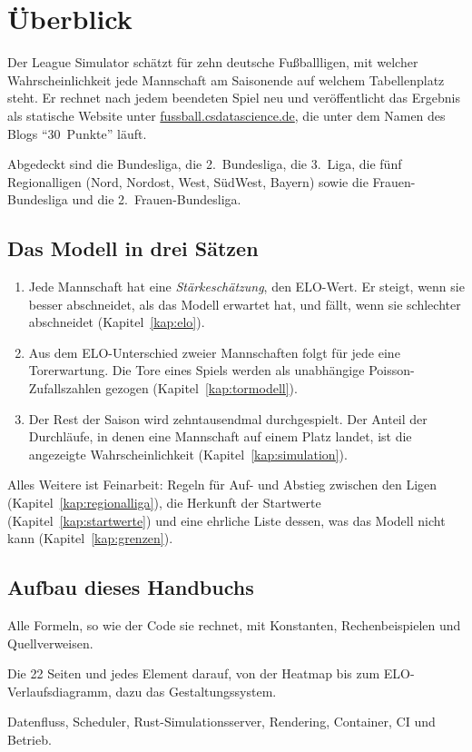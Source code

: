 \chapter{Überblick}

Der League Simulator schätzt für zehn deutsche Fußballligen, mit welcher
Wahrscheinlichkeit jede Mannschaft am Saisonende auf welchem Tabellenplatz
steht. Er rechnet nach jedem beendeten Spiel neu und veröffentlicht das
Ergebnis als statische Website unter
\href{https://fussball.csdatascience.de}{fussball.csdatascience.de}, die unter
dem Namen des Blogs \enquote{30~Punkte} läuft.

Abgedeckt sind die Bundesliga, die 2.~Bundesliga, die 3.~Liga, die fünf
Regionalligen (Nord, Nordost, West, SüdWest, Bayern) sowie die
Frauen-Bundesliga und die 2.~Frauen-Bundesliga.

\section*{Das Modell in drei Sätzen}

\begin{enumerate}
  \item Jede Mannschaft hat eine \emph{Stärkeschätzung}, den ELO-Wert. Er steigt,
        wenn sie besser abschneidet, als das Modell erwartet hat, und fällt,
        wenn sie schlechter abschneidet (Kapitel~\ref{kap:elo}).
  \item Aus dem ELO-Unterschied zweier Mannschaften folgt für jede eine
        Torerwartung. Die Tore eines Spiels werden als unabhängige
        Poisson-Zufallszahlen gezogen (Kapitel~\ref{kap:tormodell}).
  \item Der Rest der Saison wird zehntausendmal durchgespielt. Der Anteil der
        Durchläufe, in denen eine Mannschaft auf einem Platz landet, ist die
        angezeigte Wahrscheinlichkeit (Kapitel~\ref{kap:simulation}).
\end{enumerate}

Alles Weitere ist Feinarbeit: Regeln für Auf- und Abstieg zwischen den Ligen
(Kapitel~\ref{kap:regionalliga}), die Herkunft der Startwerte
(Kapitel~\ref{kap:startwerte}) und eine ehrliche Liste dessen, was das Modell
nicht kann (Kapitel~\ref{kap:grenzen}).

\section*{Aufbau dieses Handbuchs}

\begin{description}[font=\sffamily\bfseries\small]
  \item[Teil I, Methodik] Alle Formeln, so wie der Code sie rechnet,
        mit Konstanten, Rechenbeispielen und Quellverweisen.
  \item[Teil II, Website] Die 22 Seiten und jedes Element darauf, von der
        Heatmap bis zum ELO-Verlaufsdiagramm, dazu das Gestaltungssystem.
  \item[Teil III, Technik] Datenfluss, Scheduler, Rust-Simulationsserver,
        Rendering, Container, CI und Betrieb.
\end{description}

